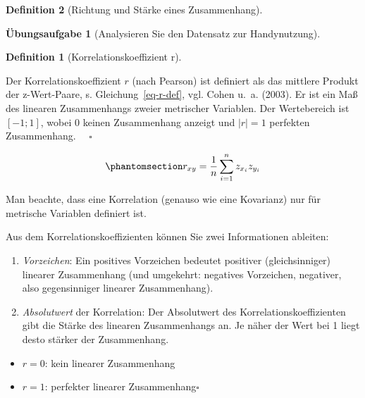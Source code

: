 \documentclass[
  a4paper,
  DIV=11]{scrreprt}
\providecommand{\tightlist}{%
  \setlength{\itemsep}{0pt}\setlength{\parskip}{0pt}}\usepackage{longtable,booktabs,array}
\theoremstyle{definition}
\newtheorem{exercise}{Übungsaufgabe}[chapter]
\theoremstyle{definition}
\theoremstyle{definition}
\newtheorem{definition}{Definition}[chapter]
\theoremstyle{remark}
\begin{document}
\begin{definition}[Richtung und Stärke eines
Zusammenhang]
\begin{exercise}[Analysieren Sie den Datensatz zur
Handynutzung]
\begin{definition}[Korrelationskoeffizient
r]\protect\hypertarget{def-r}{}\label{def-r}

Der Korrelationskoeffizient \(r\) (nach Pearson) ist definiert als das
mittlere Produkt der z-Wert-Paare, s. Gleichung~\ref{eq-r-def}, vgl.
Cohen u.~a. (2003). Er ist ein Maß des linearen Zusammenhangs zweier
metrischer Variablen. Der Wertebereich ist \([-1;1]\), wobei 0 keinen
Zusammenhang anzeigt und \(|r|=1\) perfekten Zusammenhang.
\(\quad \square\)

\end{definition}

\begin{equation}\phantomsection\label{eq-r-def}{r_{xy}=\frac{1}{n}\sum_{i=1}^n z_{x_i} z_{y_i}}\end{equation}

Man beachte, dass eine Korrelation (genauso wie eine Kovarianz) nur für
metrische Variablen definiert ist.

\begin{tcolorbox}[enhanced jigsaw, leftrule=.75mm, opacitybacktitle=0.6, colback=white, colframe=quarto-callout-note-color-frame, coltitle=black, colbacktitle=quarto-callout-note-color!10!white, opacityback=0, left=2mm, breakable, titlerule=0mm, toptitle=1mm, bottomtitle=1mm, rightrule=.15mm, title=\textcolor{quarto-callout-note-color}{\faInfo}\hspace{0.5em}{Hinweis}, arc=.35mm, bottomrule=.15mm, toprule=.15mm]

Aus dem Korrelationskoeffizienten können Sie zwei Informationen
ableiten:

\begin{enumerate}
\def\labelenumi{\arabic{enumi}.}
\tightlist
\item
  \emph{Vorzeichen}: Ein positives Vorzeichen bedeutet positiver
  (gleichsinniger) linearer Zusammenhang (und umgekehrt: negatives
  Vorzeichen, negativer, also gegensinniger linearer Zusammenhang).
\item
  \emph{Absolutwert} der Korrelation: Der Absolutwert\footnotemark{} des
  Korrelationskoeffizienten gibt die Stärke des linearen Zusammenhangs
  an. Je näher der Wert bei 1 liegt desto stärker der Zusammenhang.
\end{enumerate}

\begin{itemize}
\tightlist
\item
  \(r = 0\): kein linearer Zusammenhang
\item
  \(r = 1\): perfekter linearer Zusammenhang\(\square\)
\end{itemize}


\end{tcolorbox}
\end{exercise}
\end{definition}
\end{document}
